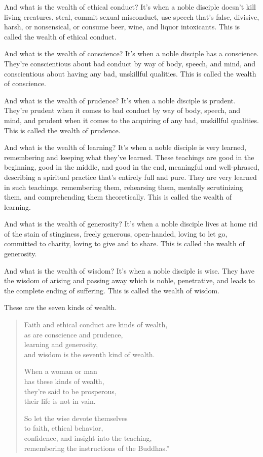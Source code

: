 \documentclass[12pt,openany]{book}%
\begin{document}
And what is the wealth of ethical conduct? It’s when a noble disciple doesn’t kill living creatures, steal, commit sexual misconduct, use speech that’s false, divisive, harsh, or nonsensical, or consume beer, wine, and liquor intoxicants. This is called the wealth of ethical conduct. 

And what is the wealth of conscience? It’s when a noble disciple has a conscience. They’re conscientious about bad conduct by way of body, speech, and mind, and conscientious about having any bad, unskillful qualities. This is called the wealth of conscience. 

And what is the wealth of prudence? It’s when a noble disciple is prudent. They’re prudent when it comes to bad conduct by way of body, speech, and mind, and prudent when it comes to the acquiring of any bad, unskillful qualities. This is called the wealth of prudence. 

And what is the wealth of learning? It’s when a noble disciple is very learned, remembering and keeping what they’ve learned. These teachings are good in the beginning, good in the middle, and good in the end, meaningful and well-phrased, describing a spiritual practice that’s entirely full and pure. They are very learned in such teachings, remembering them, rehearsing them, mentally scrutinizing them, and comprehending them theoretically. This is called the wealth of learning. 

And what is the wealth of generosity? It’s when a noble disciple lives at home rid of the stain of stinginess, freely generous, open-handed, loving to let go, committed to charity, loving to give and to share. This is called the wealth of generosity. 

And what is the wealth of wisdom? It’s when a noble disciple is wise. They have the wisdom of arising and passing away which is noble, penetrative, and leads to the complete ending of suffering. This is called the wealth of wisdom. 

These are the seven kinds of wealth. 

\begin{verse}%
Faith and ethical conduct are kinds of wealth, \\
as are conscience and prudence, \\
learning and generosity, \\
and wisdom is the seventh kind of wealth. 

When a woman or man \\
has these kinds of wealth, \\
they’re said to be prosperous, \\
their life is not in vain. 

So let the wise devote themselves \\
to faith, ethical behavior, \\
confidence, and insight into the teaching, \\
remembering the instructions of the Buddhas.” 

%
\end{verse}
\end{document}
